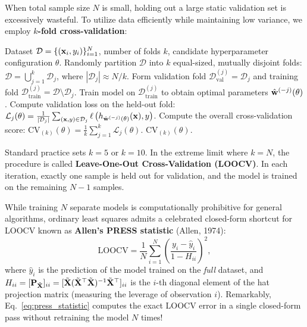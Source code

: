 When total sample size $N$ is small, holding out a large static validation set is excessively wasteful. To utilize data efficiently while maintaining low variance, we employ \textbf{$k$-fold cross-validation}:
\begin{algorithm}[H]
\caption{$k$-Fold Cross-Validation Protocol}
\label{alg:k_fold_cv}
\begin{algorithmic}[1]
\Require Dataset $\mathcal{D} = \{(\mathbf{x}_i, y_i)\}_{i=1}^N$, number of folds $k$, candidate hyperparameter configuration $\theta$.
\State Randomly partition $\mathcal{D}$ into $k$ equal-sized, mutually disjoint folds: $\mathcal{D} = \bigcup_{j=1}^k \mathcal{D}_j$, where $|\mathcal{D}_j| \approx N/k$.
  \State Form validation fold $\mathcal{D}_{\text{val}}^{(j)} = \mathcal{D}_j$ and training fold $\mathcal{D}_{\text{train}}^{(j)} = \mathcal{D} \setminus \mathcal{D}_j$.
  \State Train model on $\mathcal{D}_{\text{train}}^{(j)}$ to obtain optimal parameters $\hat{\mathbf{w}}^{(-j)}(\theta)$.
  \State Compute validation loss on the held-out fold: 
  \Statex \qquad\qquad $\mathcal{L}_j(\theta) = \frac{1}{|\mathcal{D}_j|} \sum_{(\mathbf{x}, y) \in \mathcal{D}_j} \ell\left(h_{\hat{\mathbf{w}}^{(-j)}(\theta)}(\mathbf{x}), y\right)$.
\EndFor
\State Compute the overall cross-validation score:
\Statex \qquad\qquad $\text{CV}_{(k)}(\theta) = \frac{1}{k} \sum_{j=1}^k \mathcal{L}_j(\theta)$.
\State \Return $\text{CV}_{(k)}(\theta)$.
\end{algorithmic}
\end{algorithm}

Standard practice sets $k = 5$ or $k = 10$. In the extreme limit where $k = N$, the procedure is called \textbf{Leave-One-Out Cross-Validation (LOOCV)}. In each iteration, exactly one sample is held out for validation, and the model is trained on the remaining $N-1$ samples. 

While training $N$ separate models is computationally prohibitive for general algorithms, ordinary least squares admits a celebrated closed-form shortcut for LOOCV known as \textbf{Allen's PRESS statistic} (Allen, 1974):
\begin{equation}
\text{LOOCV} = \frac{1}{N} \sum_{i=1}^N \left( \frac{y_i - \hat{y}_i}{1 - H_{ii}} \right)^2,
\label{eq:press_statistic}
\end{equation}
where $\hat{y}_i$ is the prediction of the model trained on the \textit{full} dataset, and $H_{ii} = [\mathbf{P}_{\tilde{\mathbf{X}}}]_{ii} = [\tilde{\mathbf{X}}(\tilde{\mathbf{X}}^\top \tilde{\mathbf{X}})^{-1}\tilde{\mathbf{X}}^\top]_{ii}$ is the $i$-th diagonal element of the hat projection matrix (measuring the leverage of observation $i$). Remarkably, Eq.~\eqref{eq:press_statistic} computes the exact LOOCV error in a single closed-form pass without retraining the model $N$ times!

